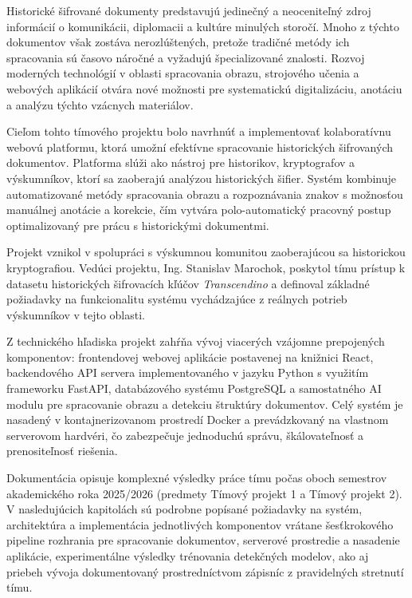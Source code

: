 Historické šifrované dokumenty predstavujú jedinečný a neoceniteľný zdroj informácií o komunikácii, diplomacii a kultúre minulých storočí. Mnoho z týchto dokumentov však zostáva nerozlúštených, pretože tradičné metódy ich spracovania sú časovo náročné a vyžadujú špecializované znalosti. Rozvoj moderných technológií v oblasti spracovania obrazu, strojového učenia a webových aplikácií otvára nové možnosti pre systematickú digitalizáciu, anotáciu a analýzu týchto vzácnych materiálov.

Cieľom tohto tímového projektu bolo navrhnúť a implementovať kolaboratívnu webovú platformu, ktorá umožní efektívne spracovanie historických šifrovaných dokumentov. Platforma slúži ako nástroj pre historikov, kryptografov a výskumníkov, ktorí sa zaoberajú analýzou historických šifier. Systém kombinuje automatizované metódy spracovania obrazu a rozpoznávania znakov s možnosťou manuálnej anotácie a korekcie, čím vytvára polo-automatický pracovný postup optimalizovaný pre prácu s historickými dokumentmi.

Projekt vznikol v spolupráci s výskumnou komunitou zaoberajúcou sa historickou kryptografiou. Vedúci projektu, Ing. Stanislav Marochok, poskytol tímu prístup k datasetu historických šifrovacích kľúčov \textit{Transcendino} a definoval základné požiadavky na funkcionalitu systému vychádzajúce z reálnych potrieb výskumníkov v tejto oblasti.

Z technického hľadiska projekt zahŕňa vývoj viacerých vzájomne prepojených komponentov: frontendovej webovej aplikácie postavenej na knižnici React, backendového API servera implementovaného v jazyku Python s využitím frameworku FastAPI, databázového systému PostgreSQL a samostatného AI modulu pre spracovanie obrazu a detekciu štruktúry dokumentov. Celý systém je nasadený v kontajnerizovanom prostredí Docker a prevádzkovaný na vlastnom serverovom hardvéri, čo zabezpečuje jednoduchú správu, škálovateľnosť a prenositeľnosť riešenia.

Dokumentácia opisuje komplexné výsledky práce tímu počas oboch semestrov akademického roka 2025/2026 (predmety Tímový projekt 1 a Tímový projekt 2). V nasledujúcich kapitolách sú podrobne popísané požiadavky na systém, architektúra a implementácia jednotlivých komponentov vrátane šesťkrokového pipeline rozhrania pre spracovanie dokumentov, serverové prostredie a nasadenie aplikácie, experimentálne výsledky trénovania detekčných modelov, ako aj priebeh vývoja dokumentovaný prostredníctvom zápisníc z pravidelných stretnutí tímu.
